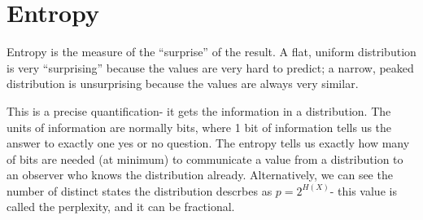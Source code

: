 \documentclass[a4paper, openany]{memoir}
\begin{document}
\section{Entropy}
Entropy is the measure of the ``surprise'' of the result. A flat, uniform distribution is very ``surprising'' because the values are very hard to predict; a narrow, peaked distribution is unsurprising because the values are always very similar.

This is a precise quantification- it gets the information in a distribution. The units of information are normally bits, where 1 bit of information tells us the answer to exactly one yes or no question. The entropy tells us exactly how many of bits are needed (at minimum) to communicate a value from a distribution to an observer who knows the distribution already. Alternatively, we can see the number of distinct states the distribution descrbes as $p = 2^{H(X)}$- this value is called the perplexity, and it can be fractional.
\end{document}
